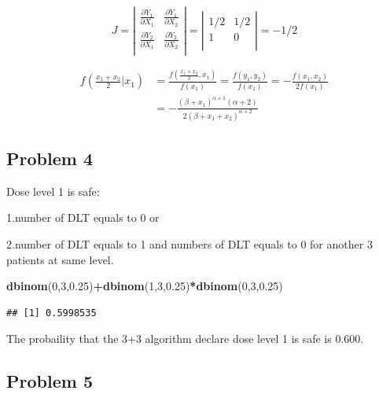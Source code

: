 \documentclass[]{article}
\newenvironment{Shaded}{\begin{snugshade}}{\end{snugshade}}
\newcommand{\DecValTok}[1]{\textcolor[rgb]{0.00,0.00,0.81}{#1}}
\newcommand{\FloatTok}[1]{\textcolor[rgb]{0.00,0.00,0.81}{#1}}
\newcommand{\KeywordTok}[1]{\textcolor[rgb]{0.13,0.29,0.53}{\textbf{#1}}}
\newcommand{\NormalTok}[1]{#1}
\newcommand{\OperatorTok}[1]{\textcolor[rgb]{0.81,0.36,0.00}{\textbf{#1}}}
\begin{document}
\[J = \left| \begin{array} {cc}
\frac{\partial Y_1}{\partial X_1} & \frac{\partial Y_1}{\partial X_2}\\
\frac{\partial Y_2}{\partial X_1} & \frac{\partial Y_2}{\partial X_2}\\
\end{array} \right | =
\left| \begin{array} {cc}
1/2 & 1/2\\
1 & 0\\
\end{array} \right | = -1/2\]

\[\begin{split}
f(\frac{x_1+x_2}{2}|x_1)&= \frac{f(\frac{x_1+x_2}{2},x_1)}{f(x_1)}=\frac{f(y_1,y_2)}{f(x_1)} = -\frac{f(x_1,x_2)}{2f(x_1)}\\
&= -\frac{(\beta+x_1)^{\alpha+1}(\alpha+2)}{2(\beta+x_1+x_2)^{\alpha+2}}
\end{split}\]

\hypertarget{problem-4}{%
\subsection{Problem 4}\label{problem-4}}

Dose level 1 is safe:

1.number of DLT equals to 0 or

2.number of DLT equals to 1 and numbers of DLT equals to 0 for another 3
patients at same level.

\begin{Shaded}
\begin{Highlighting}[]
\KeywordTok{dbinom}\NormalTok{(}\DecValTok{0}\NormalTok{,}\DecValTok{3}\NormalTok{,}\FloatTok{0.25}\NormalTok{)}\OperatorTok{+}\KeywordTok{dbinom}\NormalTok{(}\DecValTok{1}\NormalTok{,}\DecValTok{3}\NormalTok{,}\FloatTok{0.25}\NormalTok{)}\OperatorTok{*}\KeywordTok{dbinom}\NormalTok{(}\DecValTok{0}\NormalTok{,}\DecValTok{3}\NormalTok{,}\FloatTok{0.25}\NormalTok{)}
\end{Highlighting}
\end{Shaded}

\begin{verbatim}
## [1] 0.5998535
\end{verbatim}

The probaility that the 3+3 algorithm declare dose level 1 is safe is
0.600.

\hypertarget{problem-5}{%
\subsection{Problem 5}\label{problem-5}}
\end{document}
